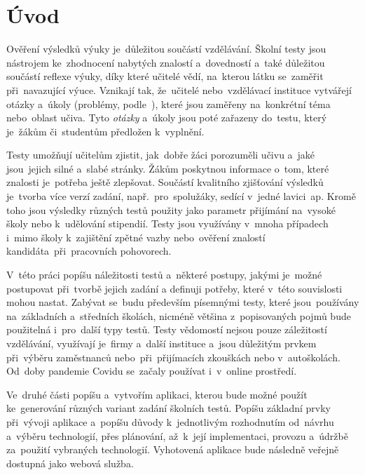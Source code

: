 \documentclass[11pt,a4paper]{report}
\begin{document}
    \setcounter{page}{1} %
    \tableofcontents
    
    \clearpage %
	
	\chapter{Úvod}
        Ověření výsledků výuky je~důležitou součástí vzdělávání. Školní testy jsou nástrojem ke~zhodnocení nabytých znalostí a~dovedností a~také důležitou součástí reflexe výuky, díky které učitelé vědí, na~kterou látku se~zaměřit při~navazující výuce. Vznikají tak, že~učitelé nebo~vzdělávací instituce vytvářejí otázky a~úkoly (problémy, podle~\cite{zhouf:tvorbamatproblemu}), které jsou zaměřeny na~konkrétní téma nebo~oblast učiva. Tyto \emph{otázky} a~úkoly jsou poté zařazeny do~testu, který je~žákům či~studentům předložen k~vyplnění.

        Testy umožňují učitelům zjistit, jak~dobře žáci porozuměli učivu a~jaké jsou~jejich silné a~slabé stránky. Žákům poskytnou informace o~tom, které znalosti je~potřeba ještě zlepšovat. Součástí kvalitního zjišťování výsledků je~tvorba více verzí zadání, např.~pro~spolužáky, sedící v~jedné lavici~ap. Kromě toho jsou výsledky různých testů použity jako parametr přijímání na~vysoké školy nebo k~udělování stipendií. Testy jsou využívány v~mnoha případech i~mimo školy k~zajištění zpětné vazby nebo~ověření znalostí kandidáta~při~pracovních pohovorech.
        
        V~této práci popíšu náležitosti testů a~některé postupy, jakými je~možné postupovat při~tvorbě jejich zadání a definuji potřeby, které v~této souvislosti mohou nastat. Zabývat se~budu především písemnými testy, které jsou~používány na~základních a~středních školách, nicméně většina z~popisovaných pojmů bude použitelná i~pro~další typy testů. Testy vědomostí nejsou pouze záležitostí vzdělávání, využívají je~firmy a~další instituce a~jsou důležitým prvkem při~výběru zaměstnanců nebo~při~přijímacích zkouškách nebo v~autoškolách. Od~doby pandemie Covidu se~začaly používat i~v~online prostředí.
        
        Ve~druhé části popíšu a~vytvořím aplikaci, kterou bude možné použít ke~generování různých variant zadání školních testů. Popíšu základní prvky při~vývoji aplikace a~popíšu důvody k~jednotlivým rozhodnutím od~návrhu a~výběru technologií, přes plánování, až~k~její implementaci, provozu a~údržbě za~použití vybraných technologií. Vyhotovená aplikace bude následně veřejně dostupná jako webová služba.
\end{document}
